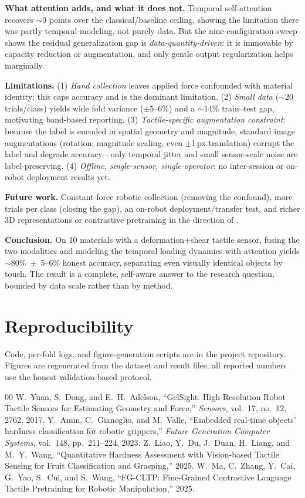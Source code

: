\documentclass[conference]{IEEEtran}
\begin{document}
\textbf{What attention adds, and what it does not.} Temporal self-attention
recovers $\sim$9 points over the classical/baseline ceiling, showing the
limitation there was partly temporal-modeling, not purely data. But the
nine-configuration sweep shows the residual generalization gap is
\emph{data-quantity-driven}: it is immovable by capacity reduction or
augmentation, and only gentle output regularization helps marginally.

\textbf{Limitations.} (1) \emph{Hand collection} leaves applied force confounded
with material identity; this caps accuracy and is the dominant limitation.
(2) \emph{Small data} ($\sim$20 trials/class) yields wide fold variance
($\pm$5--6\%) and a $\sim$14\% train--test gap, motivating band-based reporting.
(3) \emph{Tactile-specific augmentation constraint}: because the label is encoded
in spatial geometry and magnitude, standard image augmentations (rotation,
magnitude scaling, even $\pm$1\,px translation) corrupt the label and degrade
accuracy---only temporal jitter and small sensor-scale noise are
label-preserving. (4) \emph{Offline, single-sensor, single-operator}: no
inter-session or on-robot deployment results yet.

\textbf{Future work.} Constant-force robotic collection (removing the confound),
more trials per class (closing the gap), an on-robot deployment/transfer test,
and richer 3D representations or contrastive pretraining in the direction of
\cite{fgcltp2025}.

\textbf{Conclusion.} On 10 materials with a deformation+shear tactile sensor,
fusing the two modalities and modeling the temporal loading dynamics with
attention yields $\sim$80\%~$\pm$~5--6\% honest accuracy, separating even
visually identical objects by touch. The result is a complete, self-aware answer
to the research question, bounded by data scale rather than by method.

\section*{Reproducibility}
Code, per-fold logs, and figure-generation scripts are in the project
repository. Figures are regenerated from the dataset and result files;
all reported numbers use the honest validation-based protocol.

\begin{thebibliography}{00}
 W.~Yuan, S.~Dong, and E.~H.~Adelson, ``GelSight:
High-Resolution Robot Tactile Sensors for Estimating Geometry and Force,''
\emph{Sensors}, vol.~17, no.~12, 2762, 2017.
 Y.~Amin, C.~Gianoglio, and M.~Valle, ``Embedded real-time
objects' hardness classification for robotic grippers,'' \emph{Future
Generation Computer Systems}, vol.~148, pp.~211--224, 2023.
 Z.~Liao, Y.~Du, J.~Duan, H.~Liang, and M.~Y.~Wang,
``Quantitative Hardness Assessment with Vision-based Tactile Sensing for Fruit
Classification and Grasping,'' 2025.
 W.~Ma, C.~Zhang, Y.~Cai, G.~Yao, S.~Cui, and S.~Wang,
``FG-CLTP: Fine-Grained Contrastive Language Tactile Pretraining for Robotic
Manipulation,'' 2025.
\end{thebibliography}
\end{document}
